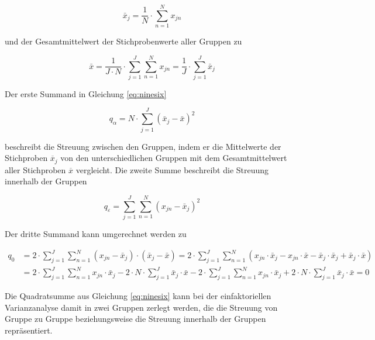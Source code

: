 \begin{equation}\label{eq:nineseven}
\bar{x}_{j} =\dfrac{1}{N} \cdot \sum _{n=1}^{N}x_{jn}
\end{equation}

\noindent und der Gesamtmittelwert der Stichprobenwerte aller Gruppen zu

\begin{equation}\label{eq:nineeight}
\bar{x}=\dfrac{1}{J\cdot N} \cdot \sum _{j=1}^{J}\sum _{n=1}^{N}x_{jn}   =\dfrac{1}{J} \cdot \sum _{j=1}^{J}\bar{x}_{j}
\end{equation}

\noindent Der erste Summand in Gleichung \eqref{eq:ninesix}

\begin{equation}\label{eq:ninenine}
q_{\alpha } =N\cdot \sum _{j=1}^{J}\left(\bar{x}_{j} -\bar{x}\right)^{2}
\end{equation}

\noindent beschreibt die Streuung zwischen den Gruppen, indem er die Mittelwerte der Stichproben ${\overline{x}}_{j}$ von den unterschiedlichen Gruppen mit dem Gesamtmittelwert aller Stichproben $\overline{x}$ vergleicht. Die zweite Summe beschreibt die Streuung innerhalb der Gruppen

\begin{equation}\label{eq:nineten}
q_{\varepsilon } =\sum _{j=1}^{J}\sum _{n=1}^{N}(x_{jn} -\bar{x}_{j})^{2}
\end{equation}

\noindent Der dritte Summand kann umgerechnet werden zu 

\begin{equation}\label{eq:nineeleven}
\begin{split}
q_{0}  & = 2\cdot \sum _{j=1}^{J}\sum _{n=1}^{N}\left(x_{jn} -\bar{x}_{j} \right)\cdot \left(\bar{x}_{j} -\bar{x}\right)  =2\cdot \sum _{j=1}^{J}\sum _{n=1}^{N}(x_{jn} \cdot \bar{x}_{j} -x_{jn} \cdot \bar{x}-\bar{x}_{j} \cdot \bar{x}_{j} +\bar{x}_{j} \cdot \bar{x}) \\
& = 2\cdot \sum _{j=1}^{J}\sum_{n=1}^{N} x_{jn}\cdot \bar{x}_{j} -2\cdot N\cdot \sum _{j=1}^{J} \bar{x}_{j}\cdot \bar{x}-2\cdot\sum _{j=1}^{J}\sum_{n=1}^{N} x_{jn}\cdot \bar{x}_{j} + 2\cdot N\cdot \sum _{j=1}^{J} \bar{x}_{j}\cdot \bar{x} = 0
\end{split}
\end{equation}

\noindent Die Quadratsumme aus Gleichung \eqref{eq:ninesix} kann bei der einfaktoriellen Varianzanalyse damit in zwei Gruppen zerlegt werden, die die Streuung von Gruppe zu Gruppe beziehungsweise die Streuung innerhalb der Gruppen repr\"{a}sentiert.

